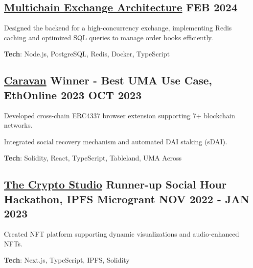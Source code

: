 \documentclass[letter,10pt]{article}
\begin{document}
\subsection{{ \href{https://github.com/Suhel-Kap/crypto-exchanger}{Multichain Exchange Architecture} \hfill FEB 2024}}
\begin{zitemize}
  \item Designed the backend for a high-concurrency exchange, implementing Redis caching and optimized SQL queries to manage order books efficiently.
  \item \textbf{Tech}: Node.js, PostgreSQL, Redis, Docker, TypeScript
\end{zitemize}

\subsection{{ \href{https://github.com/0xabh/caravan}{Caravan} Winner - Best UMA Use Case, EthOnline 2023 \hfill OCT 2023}}
\begin{zitemize}
  \item Developed cross-chain ERC4337 browser extension supporting 7+ blockchain networks.
  \item Integrated social recovery mechanism and automated DAI staking (sDAI).
  \item \textbf{Tech}: Solidity, React, TypeScript, Tableland, UMA Across
\end{zitemize}

\subsection{{ \href{https://github.com/Suhel-Kap/the-crypto-studio}{The Crypto Studio} Runner-up Social Hour Hackathon, IPFS Microgrant \hfill NOV 2022 - JAN 2023}}
\begin{zitemize}
  \item Created NFT platform supporting dynamic visualizations and audio-enhanced NFTs.
  \item \textbf{Tech}: Next.js, TypeScript, IPFS, Solidity
\end{zitemize}
\end{document}

